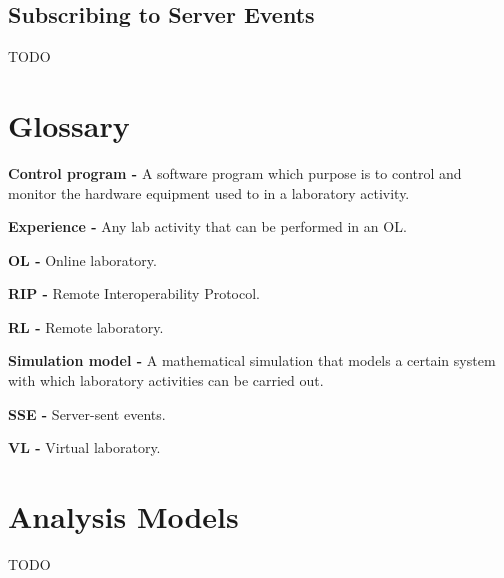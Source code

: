 \section{Subscribing to Server Events}
TODO


\begin{appendices}

\chapter{Glossary}
\textbf{Control program -} A software program which purpose is to control and monitor the hardware equipment used to in a laboratory activity.

\textbf{Experience -} Any lab activity that can be performed in an OL.

\textbf{OL -} Online laboratory.

\textbf{RIP -} Remote Interoperability Protocol.

\textbf{RL -} Remote laboratory.

\textbf{Simulation model -} A mathematical simulation that models a certain system with which laboratory activities can be carried out.

\textbf{SSE -} Server-sent events.

\textbf{VL -} Virtual laboratory.


\chapter{Analysis Models}
TODO

\end{appendices}


\renewcommand\bibname{References}
